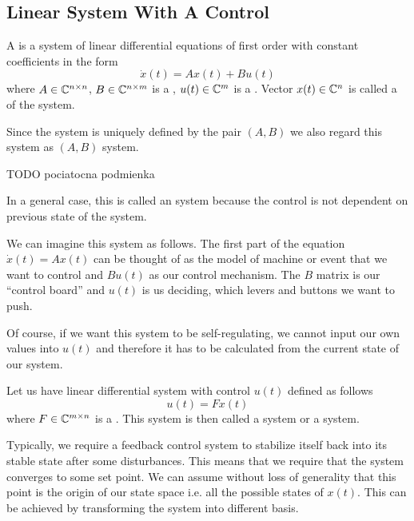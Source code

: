\subsection{Linear System With A Control}

\begin{definition}
	A  is a system of linear differential equations of first order with constant coefficients in the form $$\dot{x}(t)=Ax(t)+Bu(t)$$ where $A\in\mathbb{C}^{n\times n}$, $B\in\mathbb{C}^{n\times m}$ is a , $u(t)\in\mathbb{C}^m$ is a . Vector $x(t)\in\mathbb{C}^n$ is called a  of the system.

	Since the system is uniquely defined by the pair $(A,B)$ we also regard this system as $(A,B)$ system.

	TODO pociatocna podmienka
\end{definition}

In a general case, this is called an  system because the control is not dependent on previous state of the system.

We can imagine this system as follows. The first part of the equation $\dot{x}(t)=Ax(t)$ can be thought of as the model of machine or event that we want to control and $Bu(t)$ as our control mechanism. The $B$ matrix is our ``control board'' and $u(t)$ is us deciding, which levers and buttons we want to push. 

Of course, if we want this system to be self-regulating, we cannot input our own values into $u(t)$ and therefore it has to be calculated from the current state of our system.

\begin{definition}
	Let us have linear differential system with control $u(t)$ defined as follows $$u(t)=Fx(t)$$ where $F\in\mathbb{C}^{m\times n}$ is a . This system is then called a  system or a  system.
\end{definition}

Typically, we require a feedback control system to stabilize itself back into its stable state after some disturbances. This means that we require that the system converges to some set point. We can assume without loss of generality that this point is the origin of our state space i.e. all the possible states of $x(t)$. This can be achieved by transforming the system into different basis.

